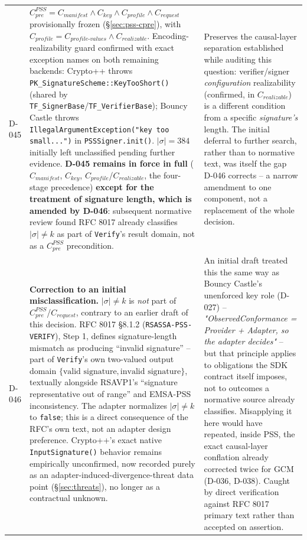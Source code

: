 \documentclass[11pt,a4paper]{article}
\begin{document}
\begin{longtable}{@{}L{0.28\textwidth}L{0.34\textwidth}L{0.30\textwidth}@{}}
D-045 & $C_{pre}^{PSS} = C_{manifest} \land C_{key} \land C_{profile} \land C_{request}$ provisionally frozen (\S\ref{sec:pss-cpre}), with $C_{profile} = C_{profile\text{-}values} \land C_{realizable}$. Encoding-realizability guard confirmed with exact exception names on both remaining backends: Crypto++ throws \texttt{PK\_SignatureScheme::KeyTooShort()} (shared by \texttt{TF\_SignerBase}/\texttt{TF\_VerifierBase}); Bouncy Castle throws \texttt{IllegalArgumentException("key too small...")} in \texttt{PSSSigner.init()}. $|\sigma|=384$ initially left unclassified pending further evidence. \textbf{D-045 remains in force in full} ($C_{manifest}$, $C_{key}$, $C_{profile}$/$C_{realizable}$, the four-stage precedence) \textbf{except for the treatment of signature length, which is amended by D-046}: subsequent normative review found RFC 8017 already classifies $|\sigma|\neq k$ as part of \texttt{Verify}'s result domain, not as a $C_{pre}^{PSS}$ precondition. & Preserves the causal-layer separation established while auditing this question: verifier/signer \emph{configuration} realizability (confirmed, in $C_{realizable}$) is a different condition from a specific \emph{signature's} length. The initial deferral to further search, rather than to normative text, was itself the gap D-046 corrects -- a narrow amendment to one component, not a replacement of the whole decision.\\
D-046 & \textbf{Correction to an initial misclassification.} $|\sigma| \neq k$ is \emph{not} part of $C_{pre}^{PSS}$/$C_{request}$, contrary to an earlier draft of this decision. RFC 8017 \S8.1.2 (\texttt{RSASSA-PSS-VERIFY}), Step 1, defines signature-length mismatch as producing ``invalid signature'' -- part of \texttt{Verify}'s own two-valued output domain $\{\text{valid signature}, \text{invalid signature}\}$, textually alongside RSAVP1's ``signature representative out of range'' and EMSA-PSS inconsistency. The adapter normalizes $|\sigma|\neq k$ to \texttt{false}; this is a direct consequence of the RFC's own text, not an adapter design preference. Crypto++'s exact native \texttt{InputSignature()} behavior remains empirically unconfirmed, now recorded purely as an adapter-induced-divergence-threat data point (\S\ref{sec:threats}), no longer as a contractual unknown. & An initial draft treated this the same way as Bouncy Castle's unenforced key role (D-027) -- \emph{"ObservedConformance = Provider + Adapter, so the adapter decides"} -- but that principle applies to obligations the SDK contract itself imposes, not to outcomes a normative source already classifies. Misapplying it here would have repeated, inside PSS, the exact causal-layer conflation already corrected twice for GCM (D-036, D-038). Caught by direct verification against RFC 8017 primary text rather than accepted on assertion.\\

\end{longtable}
\end{document}
